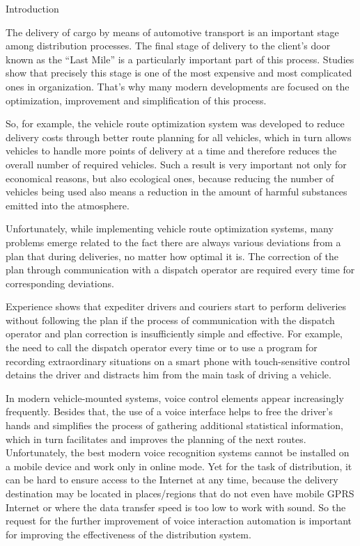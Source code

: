 Introduction

The delivery of cargo by means of automotive transport is an important stage among distribution processes. The final stage of delivery to the client’s door known as the “Last Mile” is a particularly important part of this process. Studies show that precisely this stage is one of the most expensive and most complicated ones in organization. That’s why many modern developments are focused on the optimization, improvement and simplification of this process. 

So, for example, the vehicle route optimization system was developed to reduce delivery costs through better route planning for all vehicles, which in turn allows vehicles to handle more points of delivery at a time and therefore reduces the overall number of required vehicles. Such a result is very important not only for economical reasons, but also ecological ones, because reducing the number of vehicles being used also means a reduction in the amount of harmful substances emitted into the atmosphere. 

Unfortunately, while implementing vehicle route optimization systems, many problems emerge related to the fact there are always various deviations from a plan that during deliveries, no matter how optimal it is. The correction of the plan through communication with a dispatch operator are required every time for corresponding deviations.

Experience shows that expediter drivers and couriers start to perform deliveries without following the plan if the process of communication with the dispatch operator and plan correction is insufficiently simple and effective. For example, the need to call the dispatch operator every time or to use a program for recording extraordinary situations on a smart phone with touch-sensitive control detains the driver and distracts him from the main task of driving a vehicle.

In modern vehicle-mounted systems, voice control elements appear increasingly frequently. Besides that, the use of a voice interface helps to free the driver’s hands and simplifies the process of gathering additional statistical information, which in turn facilitates and improves the planning of the next routes. Unfortunately, the best modern voice recognition systems cannot be installed on a mobile device and work only in online mode. Yet for the task of distribution, it can be hard to ensure access to the Internet at any time, because the delivery destination may be located in places/regions that do not even have mobile GPRS Internet or where the data transfer speed is too low to work with sound. So the request for the further improvement of voice interaction automation is important for improving the effectiveness of the distribution system.

